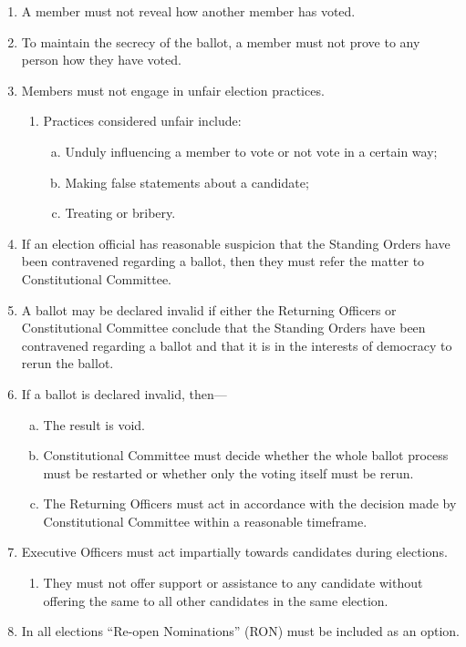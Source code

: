 \documentclass[12pt]{article}
\begin{document}
\begin{enumerate}
\begin{enumerate}
    \end{enumerate}
    \item A member must not reveal how another member has voted.
    \item To maintain the secrecy of the ballot, a member must not prove to any person how they have voted.
    \item Members must not engage in unfair election practices.
    \begin{enumerate}
        \item Practices considered unfair include:
        \begin{enumerate}[(a)]
            \item Unduly influencing a member to vote or not vote in a certain way;
            \item Making false statements about a candidate;
            \item Treating or bribery.
        \end{enumerate}
    \end{enumerate}
    \item If an election official has reasonable suspicion that the Standing Orders have been contravened regarding a ballot, then they must refer the matter to Constitutional Committee.
    \item A ballot may be declared invalid if either the Returning Officers or Constitutional Committee conclude that the Standing Orders have been contravened regarding a ballot and that it is in the interests of democracy to rerun the ballot.
    \item If a ballot is declared invalid, then—
    \begin{enumerate}[(a)]
        \item The result is void.
        \item Constitutional Committee must decide whether the whole ballot process must be restarted or whether only the voting itself must be rerun.
        \item The Returning Officers must act in accordance with the decision made by Constitutional Committee within a reasonable timeframe.
    \end{enumerate}
    \item Executive Officers must act impartially towards candidates during elections.
    \begin{enumerate}
        \item They must not offer support or assistance to any candidate without offering the same to all other candidates in the same election.
    \end{enumerate}
    \item In all elections ``Re-open Nominations'' (RON) must be included as an option.
\end{enumerate}
\newpage
\end{document}
